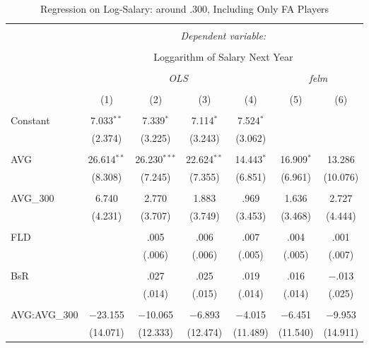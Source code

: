
\begin{table}[H] \centering
  \caption{Regression on Log-Salary: around .300, Including Only FA Players}
  \label{AVG300_F}
\fontsize{5pt}{4pt}\selectfont
\begin{tabular}{@{\extracolsep{-15pt}}lcccccc}
\\[-1.8ex]\hline
\hline \\[-1.8ex]
 & \multicolumn{6}{c}{\textit{Dependent variable:}} \\
\cline{2-7}
\\[-1.8ex] & \multicolumn{6}{c}{Loggarithm of Salary Next Year} \\
\\[-1.8ex] & \multicolumn{4}{c}{\textit{OLS}} & \multicolumn{2}{c}{\textit{felm}} \\
\\[-1.8ex] & (1) & (2) & (3) & (4) & (5) & (6)\\
\hline \\[-1.8ex]
 Constant & 7.033$^{**}$ & 7.339$^{*}$ & 7.114$^{*}$ & 7.524$^{*}$ &  &  \\
  & (2.374) & (3.225) & (3.243) & (3.062) &  &  \\
  & & & & & & \\
 AVG & 26.614$^{**}$ & 26.230$^{***}$ & 22.624$^{**}$ & 14.443$^{*}$ & 16.909$^{*}$ & 13.286 \\
  & (8.308) & (7.245) & (7.355) & (6.851) & (6.961) & (10.076) \\
  & & & & & & \\
 AVG\_300 & 6.740 & 2.770 & 1.883 & .969 & 1.636 & 2.727 \\
  & (4.231) & (3.707) & (3.749) & (3.453) & (3.468) & (4.444) \\
  & & & & & & \\
 FLD &  & .005 & .006 & .007 & .004 & .001 \\
  &  & (.006) & (.006) & (.005) & (.005) & (.007) \\
  & & & & & & \\
 BsR &  & .027 & .025 & .019 & .016 & $-$.013 \\
  &  & (.014) & (.015) & (.014) & (.014) & (.025) \\
  & & & & & & \\
 AVG:AVG\_300 & $-$23.155 & $-$10.065 & $-$6.893 & $-$4.015 & $-$6.451 & $-$9.953 \\
  & (14.071) & (12.333) & (12.474) & (11.489) & (11.540) & (14.911) \\

\end{tabular}
\end{table}
